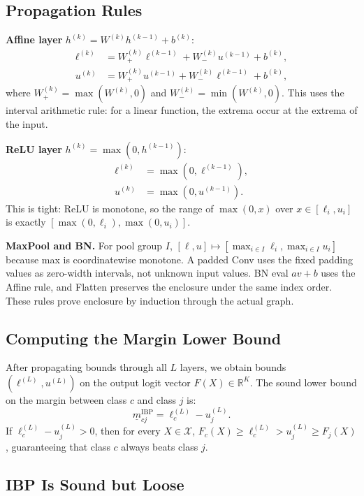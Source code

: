 \documentclass[11pt, a4paper]{article}
\theoremstyle{definition}
\theoremstyle{plain}
\newcommand{\R}{\mathbb{R}}
\newcommand{\mbm}[1]{\underline{m}_{#1}}
\begin{document}
\subsection{Propagation Rules}

\textbf{Affine layer} $h^{(k)} = W^{(k)} h^{(k-1)} + b^{(k)}$:
\begin{align}
  \ell^{(k)} &= W^{(k)}_+ \ell^{(k-1)} + W^{(k)}_- u^{(k-1)} + b^{(k)}, \\
  u^{(k)}    &= W^{(k)}_+ u^{(k-1)} + W^{(k)}_- \ell^{(k-1)} + b^{(k)},
\end{align}
where $W^{(k)}_+ = \max(W^{(k)}, 0)$ and $W^{(k)}_- = \min(W^{(k)}, 0)$.
This uses the interval arithmetic rule: for a linear function, the extrema
occur at the extrema of the input.

\textbf{ReLU layer} $h^{(k)} = \max(0, h^{(k-1)})$:
\begin{align}
  \ell^{(k)} &= \max(0, \ell^{(k-1)}), \\
  u^{(k)}    &= \max(0, u^{(k-1)}).
\end{align}
This is tight: ReLU is monotone, so the range of $\max(0, x)$ over
$x \in [\ell_i, u_i]$ is exactly $[\max(0, \ell_i), \max(0, u_i)]$.

\textbf{MaxPool and BN.} For pool group $I$,
$[\ell,u]\mapsto[\max_{i\in I}\ell_i,\max_{i\in I}u_i]$ because max is
coordinatewise monotone. A padded Conv uses the fixed padding values as
zero-width intervals, not unknown input values. BN eval $av+b$ uses the
Affine rule, and Flatten preserves the enclosure under the same index order.
These rules prove enclosure by induction through the actual graph.

\subsection{Computing the Margin Lower Bound}

After propagating bounds through all $L$ layers, we obtain bounds
$(\ell^{(L)}, u^{(L)})$ on the output logit vector $F(X) \in \R^K$.
The sound lower bound on the margin between class $c$ and class $j$ is:
\begin{equation}
  \mbm{cj}^{\text{IBP}} = \ell^{(L)}_c - u^{(L)}_j.
\end{equation}
If $\ell^{(L)}_c - u^{(L)}_j > 0$, then for every $X \in \mathcal{X}$,
$F_c(X) \ge \ell^{(L)}_c > u^{(L)}_j \ge F_j(X)$, guaranteeing that class $c$
always beats class $j$.

\subsection{IBP Is Sound but Loose}
\end{document}
